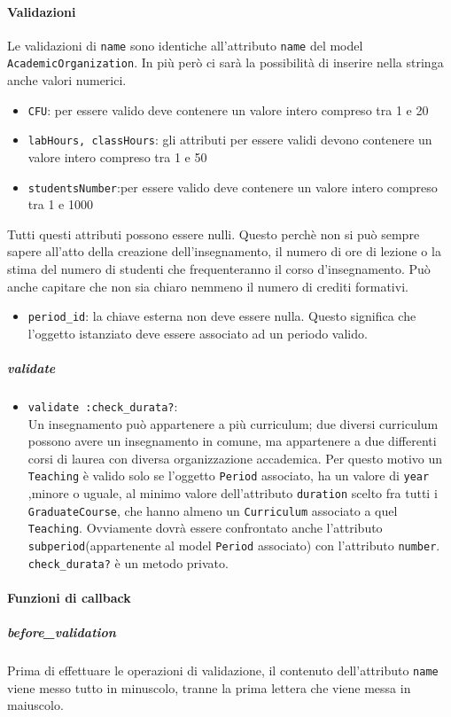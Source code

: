 \documentclass[11pt,a4paper]{article}
\begin{document}
\paragraph{Validazioni}
Le validazioni di \verb|name| sono identiche all'attributo \verb|name| del model \verb|AcademicOrganization|. In più però ci sarà la possibilità di inserire nella stringa anche valori numerici.
\begin{itemize}
 \item \verb|CFU|: per essere valido deve contenere un valore intero compreso tra 1 e 20
 \item \verb|labHours, classHours|: gli attributi per essere validi devono contenere un valore intero compreso tra 1 e 50
\item \verb|studentsNumber|:per essere valido deve contenere un valore intero compreso tra 1 e 1000
\end{itemize}
Tutti questi attributi possono essere nulli. Questo perchè non si può sempre sapere all'atto della creazione dell'insegnamento, il numero di ore di lezione o la stima del numero di studenti che frequenteranno il corso d'insegnamento. Può anche capitare che non sia chiaro nemmeno il numero di crediti formativi.
\begin{itemize}
 \item \verb|period_id|: la chiave esterna non deve essere nulla. Questo significa che l'oggetto istanziato deve essere associato ad un periodo valido.
\end{itemize}

\subparagraph{validate}
\begin{itemize}
\item \verb|validate :check_durata?|:\\ Un insegnamento può appartenere a più curriculum; due diversi curriculum possono avere un insegnamento in comune, ma appartenere a due differenti corsi di laurea con diversa organizzazione accademica.
Per questo motivo un \verb|Teaching| è valido solo se l'oggetto \verb|Period| associato, ha un valore di \verb|year| ,minore o uguale, al minimo valore dell'attributo \verb|duration| scelto fra tutti i \verb|GraduateCourse|, che hanno almeno un \verb|Curriculum| associato a quel \verb|Teaching|. Ovviamente dovrà essere confrontato anche l'attributo \verb|subperiod|(appartenente al model \verb|Period| associato) con l'attributo \verb|number|.
 \verb|check_durata?| è un metodo privato.
\end{itemize}

\paragraph{Funzioni di callback}
\subparagraph{before\_validation}
Prima di effettuare le operazioni di validazione, il contenuto dell'attributo \verb|name| viene messo tutto in minuscolo, tranne la prima lettera che viene messa in maiuscolo. 
\end{document}
